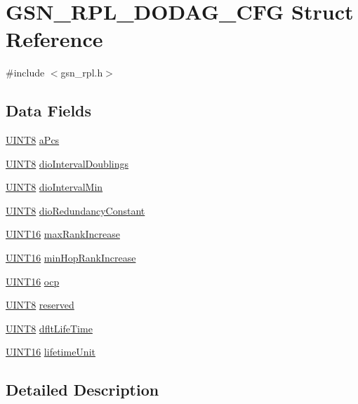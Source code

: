 \hypertarget{a00199}{
\section{GSN\_\-RPL\_\-DODAG\_\-CFG Struct Reference}
\label{a00199}
}


{\ttfamily \#include $<$gsn\_\-rpl.h$>$}

\subsection*{Data Fields}
\begin{DoxyCompactItemize}
\item 
\hyperlink{a00660_gab27e9918b538ce9d8ca692479b375b6a}{UINT8} \hyperlink{a00199_a8acbffdadb276f36b98214855b068571}{aPcs}
\item 
\hyperlink{a00660_gab27e9918b538ce9d8ca692479b375b6a}{UINT8} \hyperlink{a00199_ac65bb01c09c66d99aec44e7db7489dd7}{dioIntervalDoublings}
\item 
\hyperlink{a00660_gab27e9918b538ce9d8ca692479b375b6a}{UINT8} \hyperlink{a00199_ab41be0408af5baf26f8aab116cf12768}{dioIntervalMin}
\item 
\hyperlink{a00660_gab27e9918b538ce9d8ca692479b375b6a}{UINT8} \hyperlink{a00199_acbbeaacc828faf551a8b6f53ab53d3ae}{dioRedundancyConstant}
\item 
\hyperlink{a00660_ga09f1a1fb2293e33483cc8d44aefb1eb1}{UINT16} \hyperlink{a00199_a2028cb0b8054bd952095a5215c3d3718}{maxRankIncrease}
\item 
\hyperlink{a00660_ga09f1a1fb2293e33483cc8d44aefb1eb1}{UINT16} \hyperlink{a00199_aabdfa5f5302349771352b491e6f7c680}{minHopRankIncrease}
\item 
\hyperlink{a00660_ga09f1a1fb2293e33483cc8d44aefb1eb1}{UINT16} \hyperlink{a00199_a49e423d539b6a3bee3c7241705fe3baa}{ocp}
\item 
\hyperlink{a00660_gab27e9918b538ce9d8ca692479b375b6a}{UINT8} \hyperlink{a00199_a61b1cfce69fc0011cd7b07b127a3f3f6}{reserved}
\item 
\hyperlink{a00660_gab27e9918b538ce9d8ca692479b375b6a}{UINT8} \hyperlink{a00199_acb36a21fb713f299825d49feff9cc5f2}{dfltLifeTime}
\item 
\hyperlink{a00660_ga09f1a1fb2293e33483cc8d44aefb1eb1}{UINT16} \hyperlink{a00199_a89305a7e2d75808852a2db7365aec383}{lifetimeUnit}
\end{DoxyCompactItemize}


\subsection{Detailed Description}


